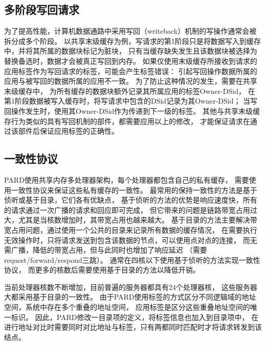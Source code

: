 %




\subsection{多阶段写回请求}
\label{chap:labeladdrspace:propagation:cache}

为了提高性能，计算机数据通路中采用写回（writeback）机制的写操作通常会被拆分成多个阶段。
以共享末级缓存为例，写请求的第1阶段只是将数据写入到缓存中，并将其所属的数据块标记为脏块，
只有当缓存缺失发生且该数据块被选择为替换备选时，数据才会被真正写回到内存。
如果仅使用末级缓存所接收到请求的应用标签作为写回请求的标签，可能会产生标签错误：
引起写回操作数据所属的应用与被写回的数据所属的应用不一致。
为了防止这种情况的发生，需要在共享末级缓存中，
为所有缓存的数据块额外记录其所属应用的标签Owner-DSid，
在第1阶段数据被写入缓存时，将写请求中包含的DSid记录为其Owner-DSid；
当写回操作发生时，使用其Owner-DSid作为传递到下一级的标签。
其他与共享末级缓存行为类似的具有写回机制的部件，都需要应用以上的修改，
才能保证请求在通过该部件后保证应用标签的正确性。


\subsection{一致性协议}

PARD使用共享内存多处理器架构，每个处理器都包含自己的私有缓存，
需要使用一致性协议来保证这些私有缓存的一致性。
最常用的保持一致性的方法是基于侦听或基于目录，它们各有优缺点，
基于侦听的方法的优势是响应速度快，所有的请求通过一次广播的请求和回应即可完成，
但它带来的问题是链路带宽占用过大，尤其是当核数增加时，其带宽占用也越来越大。
基于目录的方法主要解决带宽占用问题，通过使用一个公共的目录来记录所有数据的缓存情况，
在需要执行无效操作时，只将请求发送到包含该数据的节点，可以使用点对点的连接，
而无需广播，降低的带宽占用，但与此同时也增加了响应延迟
（需要request/forward/respond三跳）。
通常在四核以下使用基于侦听的方法实现一致性协议，
而更多的核数后需要使用基于目录的方法以降低开销。

当前处理器核数不断增加，目前普遍的服务器都具有24个处理器核，
这些服务器大都采用基于目录的一致性。
由于PARD使用标签的方式区分不同逻辑域的地址空间，系统中存在多个重叠的地址空间，
应用标签是区分这些重叠地址空间的唯一标识。
因此，PARD修改一目录项的定义，将标签信息也加入到目录项中，
在进行地址对比时需要同时对比地址与标签，只有两都同时匹配时才将请求转发到该结点。

